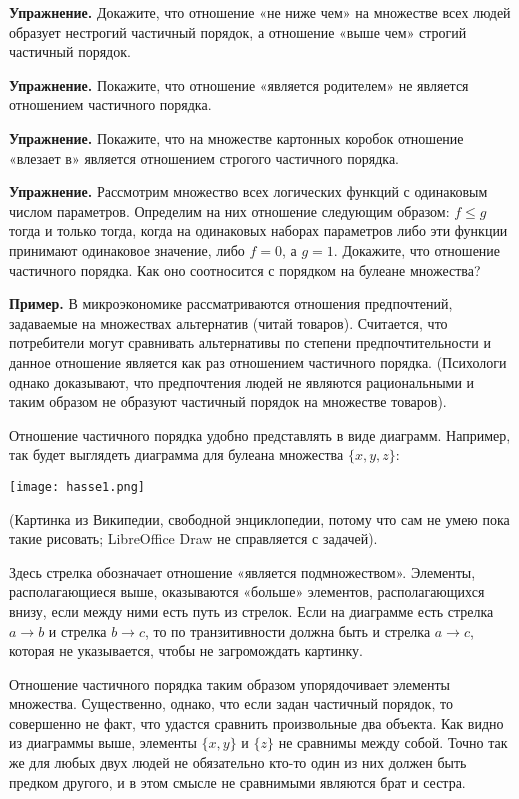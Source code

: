 {\bfseries  Упражнение.} Докажите, что отношение «не ниже чем» на множестве всех людей образует нестрогий частичный порядок, а отношение «выше чем» строгий частичный порядок.

{\bfseries Упражнение.} Покажите, что отношение «является родителем» не является отношением частичного порядка.

{\bfseries Упражнение.} Покажите, что на множестве картонных коробок отношение «влезает в» является отношением строгого частичного порядка.

{\bfseries Упражнение.} Рассмотрим множество всех логических функций с одинаковым числом параметров. Определим на них отношение следующим образом: $f\le g$ тогда и только тогда, когда на одинаковых наборах параметров либо эти функции принимают одинаковое значение, либо $f=0$, а $g=1$. Докажите, что отношение частичного порядка. Как оно соотносится с порядком на булеане множества?

{\bfseries Пример.} В микроэкономике рассматриваются отношения предпочтений, задаваемые на множествах альтернатив (читай товаров). Считается, что потребители могут сравнивать альтернативы по степени предпочтительности и данное отношение является как раз отношением частичного порядка. (Психологи однако доказывают, что предпочтения людей не являются рациональными и таким образом не образуют частичный порядок на множестве товаров).

Отношение частичного порядка удобно представлять в виде диаграмм. Например, так будет выглядеть диаграмма для булеана множества $\{x, y, z\}$:

\texttt{[image: hasse1.png]}

(Картинка из Википедии, свободной энциклопедии, потому что сам не умею пока такие рисовать; LibreOffice Draw не справляется с задачей).

Здесь стрелка обозначает отношение «является подмножеством». Элементы, располагающиеся выше, оказываются «больше» элементов, располагающихся внизу, если между ними есть путь из стрелок. Если на диаграмме есть стрелка $a\to b$ и стрелка $b\to c$, то по транзитивности должна быть и стрелка $a\to c$, которая не указывается, чтобы не загромождать картинку.

Отношение частичного порядка таким образом упорядочивает элементы множества. Существенно, однако, что если задан частичный порядок, то совершенно не факт, что удастся сравнить произвольные два объекта. Как видно из диаграммы выше, элементы $\{x, y\}$ и $\{z\}$ не сравнимы между собой. Точно так же для любых двух людей не обязательно кто-то один из них должен быть предком другого, и в этом смысле не сравнимыми являются брат и сестра.

